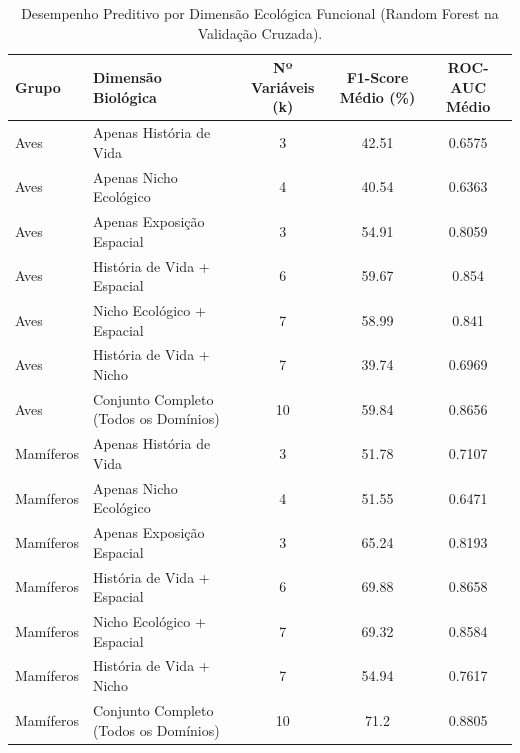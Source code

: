 \begin{table}[htbp]
\centering
\caption{Desempenho Preditivo por Dimensão Ecológica Funcional (Random Forest na Validação Cruzada).}
\label{tab:dominios_biologicos}
\begin{tabular}{llccc}
\hline
\textbf{Grupo} & \textbf{Dimensão Biológica} & \textbf{Nº Variáveis (k)} & \textbf{F1-Score Médio (\%)} & \textbf{ROC-AUC Médio} \\
\hline
Aves & Apenas História de Vida & 3 & 42.51 & 0.6575 \\
Aves & Apenas Nicho Ecológico & 4 & 40.54 & 0.6363 \\
Aves & Apenas Exposição Espacial & 3 & 54.91 & 0.8059 \\
Aves & História de Vida + Espacial & 6 & 59.67 & 0.854 \\
Aves & Nicho Ecológico + Espacial & 7 & 58.99 & 0.841 \\
Aves & História de Vida + Nicho & 7 & 39.74 & 0.6969 \\
Aves & Conjunto Completo (Todos os Domínios) & 10 & 59.84 & 0.8656 \\
Mamíferos & Apenas História de Vida & 3 & 51.78 & 0.7107 \\
Mamíferos & Apenas Nicho Ecológico & 4 & 51.55 & 0.6471 \\
Mamíferos & Apenas Exposição Espacial & 3 & 65.24 & 0.8193 \\
Mamíferos & História de Vida + Espacial & 6 & 69.88 & 0.8658 \\
Mamíferos & Nicho Ecológico + Espacial & 7 & 69.32 & 0.8584 \\
Mamíferos & História de Vida + Nicho & 7 & 54.94 & 0.7617 \\
Mamíferos & Conjunto Completo (Todos os Domínios) & 10 & 71.2 & 0.8805 \\
\hline
\end{tabular}
\end{table}

